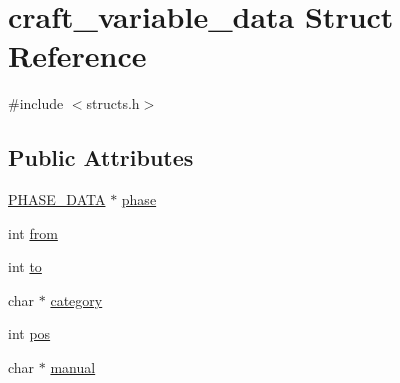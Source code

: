 \hypertarget{structcraft__variable__data}{\section{craft\-\_\-variable\-\_\-data Struct Reference}
\label{structcraft__variable__data}
}


{\ttfamily \#include $<$structs.\-h$>$}

\subsection*{Public Attributes}
\begin{DoxyCompactItemize}
\item 
\hyperlink{structs_8h_a946fd03f2da414ee020673d226fbae22}{P\-H\-A\-S\-E\-\_\-\-D\-A\-T\-A} $\ast$ \hyperlink{structcraft__variable__data_a3da2e20973184026efacb4d2f0f36ed2}{phase}
\item 
int \hyperlink{structcraft__variable__data_a0cf8d84a9dcd5e2625fa3aabddf0dc42}{from}
\item 
int \hyperlink{structcraft__variable__data_a15587e434f5e1f620962ec72df09e4df}{to}
\item 
char $\ast$ \hyperlink{structcraft__variable__data_a01b35fe228e246e9a05235efdaf1ae63}{category}
\item 
int \hyperlink{structcraft__variable__data_a022022598a25d68e32baf8d008f151ee}{pos}
\item 
char $\ast$ \hyperlink{structcraft__variable__data_a4ecbffa13a781844c44000beeb62a420}{manual}
\end{DoxyCompactItemize}


